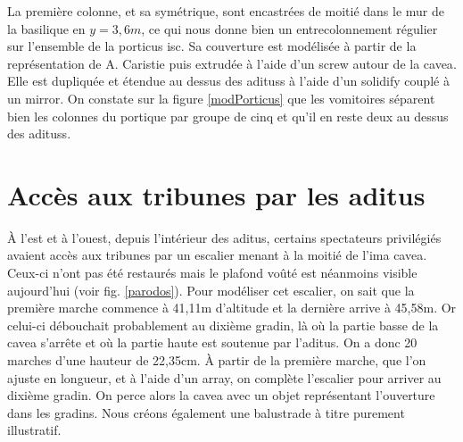 La première colonne, et sa symétrique, sont encastrées de moitié dans le mur de la basilique en $y=3,6m$, ce qui nous donne bien un entrecolonnement régulier sur l'ensemble de la \gls{porticus isc}. Sa couverture est modélisée à partir de la représentation de A. Caristie \cite[Pl. III et VI]{orangePl} puis extrudée à l'aide d'un \gls{screw} autour de la  \gls{cavea}. Elle est dupliquée et étendue au dessus des \glspl{aditus} à l'aide d'un \gls{solidify} couplé à un \gls{mirror}. On constate sur la figure \ref{modPorticus} que les vomitoires séparent bien les colonnes du portique par groupe de cinq et qu'il en reste deux au dessus des \glspl{aditus}.


\section{Accès aux tribunes par les \gls{aditus}} \label{sect-escaliers}

\`A l'est et à l'ouest, depuis l'intérieur des  \gls{aditus}, certains spectateurs privilégiés avaient accès aux tribunes par un escalier menant à la moitié de l'\gls{ima cavea}. Ceux-ci n'ont pas été restaurés mais le plafond voûté est néanmoins visible aujourd'hui (voir fig. \ref{parodos}). Pour modéliser cet escalier, on sait que la première marche commence à 41,11m d'altitude et la dernière arrive à 45,58m. Or celui-ci débouchait probablement au dixième gradin, là où la partie basse de la  \gls{cavea} s'arrête et où la partie haute est soutenue par l'\gls{aditus}. On a donc 20 marches d'une hauteur de 22,35cm. À partir de la première marche, que l'on ajuste en longueur, et à l'aide d'un \gls{array}, on complète l'escalier pour arriver au dixième gradin. On perce alors la \gls{cavea} avec un objet représentant l'ouverture dans les gradins. Nous créons également une balustrade à titre purement illustratif.

